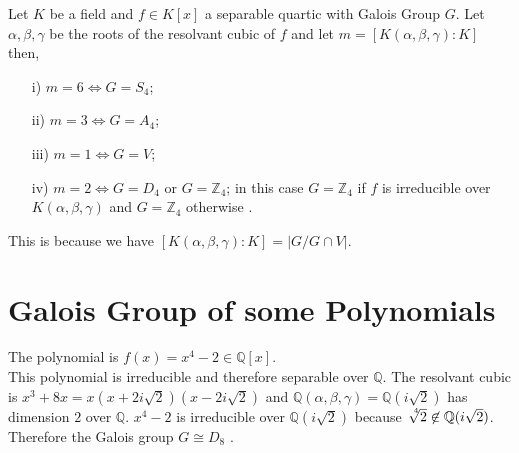 \begin{theorem}
  Let \(K\) be a field and \(f \in K[x]\) a separable quartic with Galois Group \(G\). Let \(\alpha, \beta, \gamma\) be the roots of the resolvant cubic of \(f\) and let \(m= [K(\alpha, \beta, \gamma) : K]\) then,
\begin{enumerate}
\item[i)] \(m=6 \Longleftrightarrow G=S_4\);
\item[ii)] \(m=3 \Longleftrightarrow G=A_4\);
\item[iii)] \(m=1 \Longleftrightarrow G=V\);
\item[iv)] \(m=2 \Longleftrightarrow G=D_4\) or \(G={\mathbb{Z}}_4\); in this case \(G={\mathbb{Z}}_4\) if \(f\) is irreducible over \(K(\alpha, \beta, \gamma)\) and \(G={\mathbb{Z}}_4\) otherwise \cite{hunger}.
  \end{enumerate}
\end{theorem}
This is because we have \([K(\alpha,\beta,\gamma):K] = |G/G \cap V|\).

\section{Galois Group of some Polynomials}

\begin{example}
The polynomial is \(f(x)=x^4-2 \in \mathbb{Q}[x]\).\\
This polynomial is irreducible and therefore separable over \(\mathbb{Q}\). The resolvant cubic is \(x^3+8x = x(x+2i\sqrt{2})(x-2i\sqrt{2})\) and
\(\mathbb{Q}(\alpha,\beta, \gamma)=\mathbb{Q}(i\sqrt{2})\) has dimension \(2\) over \(\mathbb{Q}\). \(x^4-2\) is irreducible over \(\mathbb{Q}(i\sqrt{2})\) because \(\sqrt[\leftroot{-3}\uproot{3}4]{2} \not\in \mathbb{Q}(i\sqrt{2})\).
Therefore the Galois group \(G \cong D_8\) \cite{hunger}.
\end{example}

